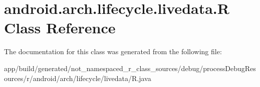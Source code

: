 \hypertarget{classandroid_1_1arch_1_1lifecycle_1_1livedata_1_1_r}{}\section{android.\+arch.\+lifecycle.\+livedata.\+R Class Reference}
\label{classandroid_1_1arch_1_1lifecycle_1_1livedata_1_1_r}


The documentation for this class was generated from the following file\+:\begin{DoxyCompactItemize}
\item 
app/build/generated/not\+\_\+namespaced\+\_\+r\+\_\+class\+\_\+sources/debug/process\+Debug\+Resources/r/android/arch/lifecycle/livedata/R.\+java\end{DoxyCompactItemize}
